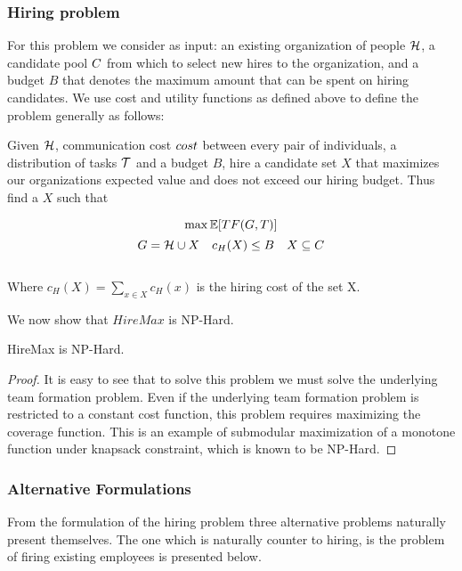 \subsubsection{Hiring problem}

For this problem we consider as input: an existing organization of people $\mathcal{H}$, a candidate pool ${C}$ from which to select new hires to the organization, and a budget $B$ that denotes the maximum amount that can be spent on hiring candidates.
We use cost and utility functions as defined above to define the problem generally as follows:
\begin{problem}
[HireMax] Given $\mathcal{H}$, communication cost $cost$ between every pair of individuals, a distribution of tasks $\mathcal{T}$ and a budget $B$, hire a candidate set $X$ that maximizes our organizations expected value and does not exceed our hiring budget. Thus find a $X$ such that

$$ \max \mathbb{E}[TF(G,T)]  $$
$$ G=\mathcal{H}  \cup X \quad c_H(X) \le B \quad X \subseteq C $$\\
Where $c_H(X) = \sum_{x \in X} c_H(x)$ is the hiring cost of the set X.\\
 
\end{problem}
	
We now show that $HireMax$ is NP-Hard.

\begin{theorem} \label{thm:HM-hardness}
HireMax is NP-Hard.
\end{theorem}

\begin{proof}
It is easy to see that to solve this problem we must solve the underlying team formation problem. Even if the underlying team formation problem is restricted to a constant cost function, this problem requires maximizing the coverage function. This is an example of submodular maximization of a monotone function under knapsack constraint, which is known to be NP-Hard.  
\end{proof}

\subsubsection{Alternative Formulations}

From the formulation of the hiring problem three alternative problems naturally present themselves. The one which is naturally counter to hiring, is the problem of firing existing employees is presented below.  

